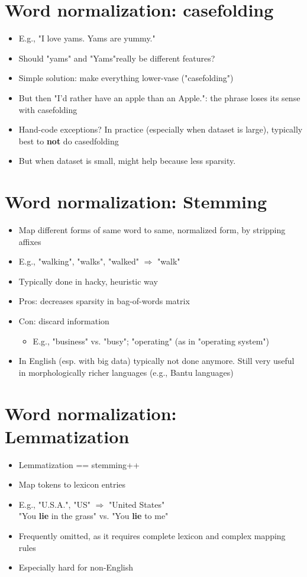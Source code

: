 \documentclass[11pt]{article}
\begin{document}
\section*{Word normalization: casefolding}

\begin{itemize}
	\item E.g., "I love yams. Yams are yummy."
	\item Should "yams" and "Yams"really be different features?
	\item Simple solution: make everything lower-vase ("casefolding")
	\item But then "I'd rather have an apple than an Apple.": the phrase loses its sense with casefolding
	\item Hand-code exceptions? In practice (especially when dataset is large), typically best to \textbf{not} do casedfolding
	\item But when dataset is small, might help because less sparsity. 
\end{itemize}

\section*{Word normalization: Stemming}
\begin{itemize}
	\item Map different forms of same word to same, normalized form, by stripping affixes
	\item E.g., "walking", "walks", "walked" $\Rightarrow$ "walk"
	\item Typically done in hacky, heuristic way
	\item Pros: decreases sparsity in bag-of-words matrix
	\item Con: discard information
		\begin{itemize}
			\item E.g., "business" vs. "busy"; "operating" (as in "operating system")
		\end{itemize}
	\item In English (esp. with big data) typically not done anymore. Still very useful in morphologically richer languages (e.g., Bantu languages)
\end{itemize}

\section*{Word normalization: Lemmatization}
\begin{itemize}
	\item Lemmatization == stemming++
	\item Map tokens to lexicon entries
	\item E.g., "U.S.A.", "US" $\Rightarrow$ "United States" \\
		"You \textbf{lie} in the grass" vs. "You \textbf{lie} to me"
	\item Frequently omitted, as it requires complete lexicon and complex mapping rules
	\item Especially hard for non-English
\end{itemize}
\end{document}
